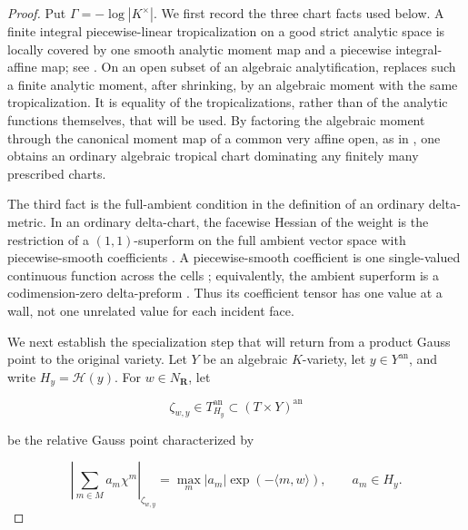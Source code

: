 
\begin{proof}
Put \(\Gamma=-\log|K^\times|\).  We first record the three chart facts
used below.  A finite integral piecewise-linear tropicalization on a good
strict analytic space is locally covered by one smooth analytic moment map
and a piecewise integral-affine map; see
\cite[Proposition~8.3 and \S8.4]{GJR26}.  On an open subset of an algebraic
analytification, \cite[Proposition~7.2]{Gub16} replaces such a finite
analytic moment, after shrinking, by an algebraic moment with the same
tropicalization.  It is equality of the tropicalizations, rather than of
the analytic functions themselves, that will be used.  By factoring the
algebraic moment through the canonical moment map of a common very affine
open, as in \cite[\S4.12]{Gub16}, one obtains an ordinary algebraic
tropical chart dominating any finitely many prescribed charts.

The third fact is the full-ambient condition in the definition of an
ordinary delta-metric.  In an ordinary delta-chart, the facewise Hessian of
the weight is the restriction of a \((1,1)\)-superform on the full ambient
vector space with piecewise-smooth coefficients
\cite[Definition~9.9(ii) and \S9.13]{GK17}.  A piecewise-smooth coefficient
is one single-valued continuous function across the cells
\cite[Definition~1.6]{GK17}; equivalently, the ambient superform is a
codimension-zero delta-preform
\cite[Remark~1.7, Example~2.10, and Remark~9.10]{GK17}.  Thus its
coefficient tensor has one value at a wall, not one unrelated value for
each incident face.

We next establish the specialization step that will return from a product
Gauss point to the original variety.  Let \(Y\) be an algebraic
\(K\)-variety, let \(y\in Y^{\mathrm{an}}\), and write
\(H_y=\mathcal H(y)\).  For \(w\in N_{\mathbf R}\), let

\[
             \zeta_{w,y}\in T_{H_y}^{\mathrm{an}}
                    \subset (T\times Y)^{\mathrm{an}}
\]

be the relative Gauss point characterized by

\begin{equation}
\label{eq:p09p2-relative-gauss-point}
 \left|\sum_{m\in M}a_m\chi^m\right|_{\zeta_{w,y}}
   =\max_m |a_m|\exp(-\langle m,w\rangle),
 \qquad a_m\in H_y.
\end{equation}


\end{proof}
